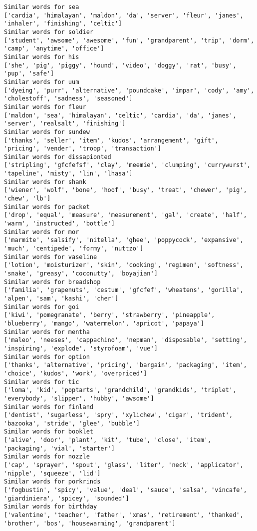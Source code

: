 \documentclass[11pt]{article}
\begin{document}
\begin{Verbatim}[commandchars=\\\{\}]
Similar words for sea
['cardia', 'himalayan', 'maldon', 'da', 'server', 'fleur', 'janes', 'inhaler', 'finishing', 'celtic']
Similar words for soldier
['student', 'awsome', 'awesome', 'fun', 'grandparent', 'trip', 'dorm', 'camp', 'anytime', 'office']
Similar words for his
['she', 'pig', 'piggy', 'hound', 'video', 'doggy', 'rat', 'busy', 'pup', 'safe']
Similar words for uum
['dyeing', 'purr', 'alternative', 'poundcake', 'impar', 'cody', 'amy', 'cholestoff', 'sadness', 'seasoned']
Similar words for fleur
['maldon', 'sea', 'himalayan', 'celtic', 'cardia', 'da', 'janes', 'server', 'realsalt', 'finishing']
Similar words for sundew
['thanks', 'seller', 'item', 'kudos', 'arrangement', 'gift', 'pricing', 'vender', 'troop', 'transaction']
Similar words for dissapionted
['stripling', 'gfcfefsf', 'clay', 'meemie', 'clumping', 'currywurst', 'tapeline', 'misty', 'lin', 'lhasa']
Similar words for shank
['wiener', 'wolf', 'bone', 'hoof', 'busy', 'treat', 'chewer', 'pig', 'chew', 'lb']
Similar words for packet
['drop', 'equal', 'measure', 'measurement', 'gal', 'create', 'half', 'warm', 'instructed', 'bottle']
Similar words for mor
['marmite', 'salsify', 'nitella', 'ghee', 'poppycock', 'expansive', 'much', 'centipede', 'formy', 'nuttzo']
Similar words for vaseline
['lotion', 'moisturizer', 'skin', 'cooking', 'regimen', 'softness', 'snake', 'greasy', 'coconutty', 'boyajian']
Similar words for breadshop
['familia', 'grapenuts', 'cestum', 'gfcfef', 'wheatens', 'gorilla', 'alpen', 'sam', 'kashi', 'cher']
Similar words for goi
['kiwi', 'pomegranate', 'berry', 'strawberry', 'pineapple', 'blueberry', 'mango', 'watermelon', 'apricot', 'papaya']
Similar words for mentha
['maleo', 'neeses', 'cappachino', 'nepman', 'disposable', 'setting', 'inspiring', 'explode', 'styrofoam', 'vue']
Similar words for option
['thanks', 'alternative', 'pricing', 'bargain', 'packaging', 'item', 'choice', 'kudos', 'work', 'overpriced']
Similar words for tic
['loma', 'kid', 'poptarts', 'grandchild', 'grandkids', 'triplet', 'everybody', 'slipper', 'hubby', 'awsome']
Similar words for finland
['dentist', 'sugarless', 'spry', 'xylichew', 'cigar', 'trident', 'bazooka', 'stride', 'glee', 'bubble']
Similar words for booklet
['alive', 'door', 'plant', 'kit', 'tube', 'close', 'item', 'packaging', 'vial', 'starter']
Similar words for nozzle
['cap', 'sprayer', 'spout', 'glass', 'liter', 'neck', 'applicator', 'nipple', 'squeeze', 'lid']
Similar words for porkrinds
['fogbustin', 'spicy', 'value', 'deal', 'sauce', 'salsa', 'vincafe', 'giardiniera', 'spicey', 'sounded']
Similar words for birthday
['valentine', 'teacher', 'father', 'xmas', 'retirement', 'thanked', 'brother', 'bos', 'housewarming', 'grandparent']

\end{Verbatim}
\end{document}
